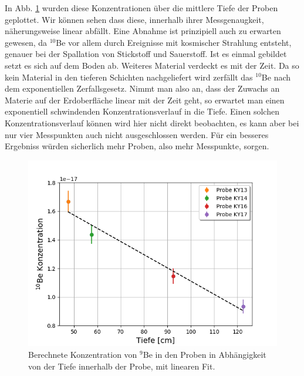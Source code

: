 In Abb. \ref{deep} wurden diese Konzentrationen über die mittlere Tiefe der Proben geplottet.
Wir können sehen dass diese, innerhalb ihrer Messgenaugkeit, näherungsweise linear abfällt.
Eine Abnahme ist prinzipiell auch zu erwarten gewesen, da $^{10}$Be vor allem durch Ereignisse mit kosmischer Strahlung entsteht, genauer bei der Spallation von Stickstoff und Sauerstoff.
Ist es einmal gebildet setzt es sich auf dem Boden ab.
Weiteres Material verdeckt es mit der Zeit.
Da so kein Material in den tieferen Schichten nachgeliefert wird zerfällt das $^{10}$Be nach dem exponentiellen Zerfallsgesetz.
Nimmt man also an, dass der Zuwachs an Materie auf der Erdoberfläche linear mit der Zeit geht, so erwartet man einen exponentiell schwindenden Konzentrationsverlauf in die Tiefe. 
Einen solchen Konzentrationsverlauf können wird hier nicht direkt beobachten, es kann aber bei nur vier Messpunkten auch nicht ausgeschlossen werden.
Für ein besseres Ergebniss würden sicherlich mehr Proben, also mehr Messpunkte, sorgen.

\begin{figure}[ht]
  \centering
  \includegraphics[width=0.7\linewidth]{Pictures/10be_konzentration.png}
  \caption{Berechnete Konzentration von $^9$Be in den Proben in Abhängigkeit von der Tiefe innerhalb der Probe, mit linearen Fit.}
  \label{deep}
\end{figure}
\clearpage
